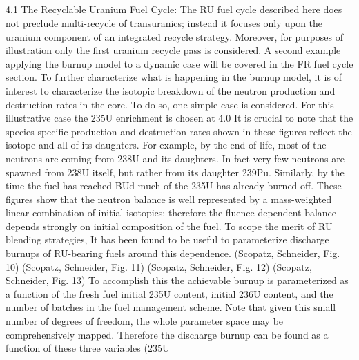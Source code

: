 \subsection{}
\label{1g_sec:}
4.1 The Recyclable Uranium Fuel Cycle:
The RU fuel cycle described here does not preclude multi-recycle of transuranics; instead it focuses only upon the uranium component of an integrated recycle strategy.  Moreover, for purposes of illustration only the first uranium recycle pass is considered.  A second example applying the burnup model to a dynamic case will be covered in the FR fuel cycle section.
To further characterize what is happening in the burnup model, it is of interest to characterize the isotopic breakdown of the neutron production and destruction rates in the core.  To do so, one simple case is considered.
For this illustrative case the 235U enrichment is chosen at 4.0%
It is crucial to note that the species-specific production and destruction rates shown in these figures reflect the isotope and all of its daughters.  For example, by the end of life, most of the neutrons are coming from 238U and its daughters.  In fact very few neutrons are spawned from 238U itself, but rather from its daughter 239Pu.  Similarly, by the time the fuel has reached BUd much of the 235U has already burned off.  These figures show that the neutron balance is well represented by a mass-weighted linear combination of initial isotopics; therefore the fluence dependent balance depends strongly on initial composition of the fuel.  To scope the merit of RU blending strategies, It has been found to be useful to parameterize discharge burnups of RU-bearing fuels around this dependence.
(Scopatz, Schneider, Fig. 10)
(Scopatz, Schneider, Fig. 11)
(Scopatz, Schneider, Fig. 12)
(Scopatz, Schneider, Fig. 13)
To accomplish this the achievable burnup is parameterized as a function of the fresh fuel initial 235U content, initial 236U content, and the number of batches in the fuel management scheme.    Note that given this small number of degrees of freedom, the whole parameter space may be comprehensively mapped.  Therefore the discharge burnup can be found as a function of these three variables (235U%
